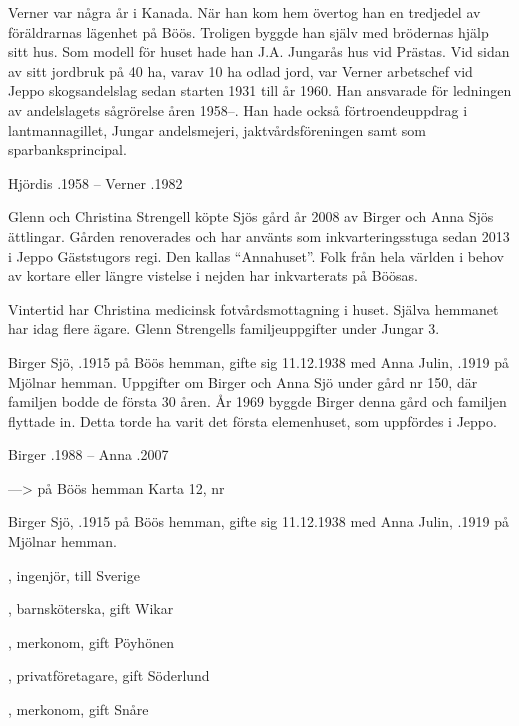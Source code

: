 Verner var några år i Kanada. När han kom hem övertog han en tredjedel av föräldrarnas lägenhet på Böös. Troligen byggde han själv med brödernas hjälp sitt hus. Som modell för huset hade han J.A. Jungarås hus vid Prästas. Vid sidan av sitt jordbruk på 40 ha, varav 10 ha odlad jord, var Verner arbetschef vid Jeppo skogsandelslag sedan starten 1931 till år 1960. Han ansvarade för ledningen av andelslagets sågrörelse åren 1958--. Han hade också förtroendeuppdrag i lantmannagillet, Jungar andelsmejeri, jaktvårdsföreningen samt som sparbanksprincipal.

Hjördis .1958  --  Verner .1982




Glenn och Christina Strengell köpte Sjös gård år 2008 av Birger och Anna Sjös ättlingar. Gården renoverades och har använts som
inkvarteringsstuga sedan 2013 i Jeppo Gäststugors regi. Den kallas ``Annahuset''. Folk från hela världen i behov av kortare eller längre vistelse i nejden har inkvarterats på Böösas.


Vintertid har Christina medicinsk fotvårdsmottagning i huset. Själva hemmanet har idag flere ägare. Glenn Strengells familjeuppgifter under Jungar 3.


Birger Sjö, .1915 på Böös hemman, gifte sig 11.12.1938 med Anna Julin, .1919 på Mjölnar hemman. Uppgifter om Birger och Anna Sjö under gård nr 150, där familjen bodde de första 30 åren. År 1969 byggde Birger denna gård och familjen flyttade in. Detta torde ha varit det första elemenhuset, som uppfördes i Jeppo.

Birger .1988  --  Anna .2007


--->  på Böös hemman	Karta 12,  nr 

Birger Sjö, .1915 på Böös hemman, gifte sig 11.12.1938 med Anna Julin, .1919 på Mjölnar hemman.
\begin{jhchildren}
  \item {}, ingenjör, till Sverige
  \item {}, barnsköterska, gift Wikar
  \item {}, merkonom, gift Pöyhönen
  \item {}, privatföretagare, gift Söderlund
  \item {}, merkonom, gift Snåre
\end{jhchildren}

